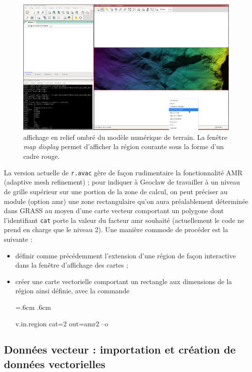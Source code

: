 \documentclass[12pt,oneside]{paper}
\newenvironment{code}{%
\vspace{2mm}%
\hangindent=.6cm%
\parindent.6cm%
\ttfamily%
\color{gris.3}%
}{
\vspace{2mm}%
}
\newcommand{\bei}{\begin{itemize}}
\newcommand{\eit}{\end{itemize}}
\begin{document}
\begin{figure}[!h]
\begin{center}
\includegraphics[width=1\hsize, angle=00]{capture1.eps}
\caption{affichage en relief ombré du modèle numérique de terrain. La fenêtre \emph{map display} permet d'afficher la région courante sous la forme d'un cadre rouge.}
\label{fig:raster}
\end{center}
\end{figure}

La version actuelle de \verb+r.avac+ gère de façon rudimentaire la fonctionnalité AMR (adaptive mesh refinement) ; pour indiquer à Geoclaw de travailler à un niveau de grille supérieur sur une portion de la zone de calcul, on peut préciser au module (option amr) une zone rectangulaire qu'on aura préalablement déterminée dans GRASS au moyen d'une carte vecteur comportant un polygone dont l'identifiant \texttt{cat} porte la valeur du facteur amr souhaité (actuellement le code ne prend en charge que le niveau 2). Une manière commode de procéder est la suivante :
\bei
\item définir comme précédemment l'extension d'une région de façon interactive dans la fenêtre d'affichage des cartes ;
\item créer une carte vectorielle comportant un rectangle aux dimensions de la région ainsi définie, avec la commande 

\begin{code}
v.in.region cat=2 out=amr2 --o
\end{code}
\eit

\subsection{Données vecteur : importation et création de données vectorielles}
\end{document}
